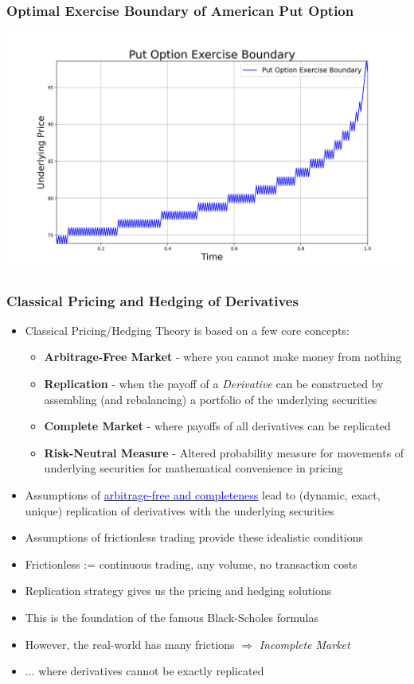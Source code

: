\documentclass[handout]{beamer}
\begin{document}
\begin{frame}
\frametitle{Optimal Exercise Boundary of American Put Option}
\includegraphics[scale=0.4]{put_option_ex_boundary.png}
\end{frame}

\begin{frame}
\frametitle{Classical Pricing and Hedging of Derivatives}
\pause
\begin{itemize}[<+->]
\item Classical Pricing/Hedging Theory is based on a few core concepts:
\begin{itemize}
\item {\bf Arbitrage-Free Market} - where you cannot make money from nothing
\item {\bf Replication} - when the payoff of a {\em Derivative} can be constructed by assembling (and rebalancing) a portfolio of the underlying securities
\item {\bf Complete Market} - where payoffs of all derivatives can be replicated
\item {\bf Risk-Neutral Measure} - Altered probability measure for movements of underlying securities for mathematical convenience in pricing
\end{itemize}

\item Assumptions of \href{https://github.com/coverdrive/technical-documents/blob/master/finance/ArbitrageCompleteness.pdf}{\underline{\textcolor{blue}{arbitrage-free and completeness}}}
lead to (dynamic, exact, unique) replication of derivatives with the underlying securities
\item Assumptions of frictionless trading provide these idealistic conditions
\item Frictionless := continuous trading, any volume, no transaction costs
\item Replication strategy gives us the pricing and hedging solutions
\item This is the foundation of the famous Black-Scholes formulas
\item However, the real-world has many frictions $\Rightarrow$ {\em Incomplete Market}
\item ... where derivatives cannot be exactly replicated
\end{itemize}
\end{frame}
\end{document}
